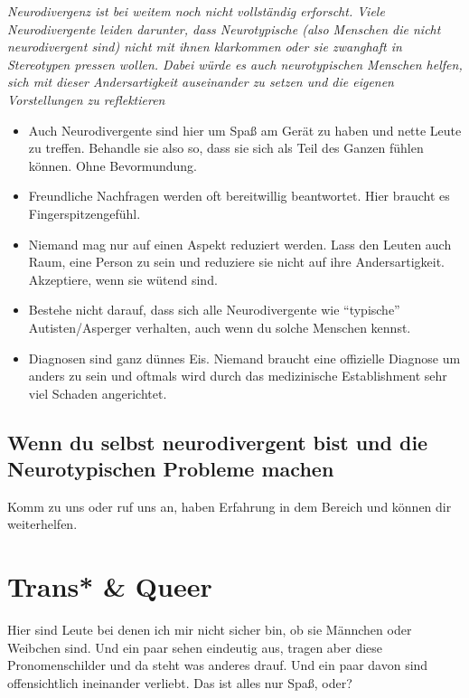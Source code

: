 \documentclass[10pt,notumble]{leaflet}
\newcommand\dos{\item[$+$]}
\newcommand\donts{\item[$-$]}
\begin{document}
\emph{Neurodivergenz ist bei weitem noch nicht vollständig
  erforscht. Viele Neurodivergente leiden darunter, dass Neurotypische
  (also Menschen die nicht neurodivergent sind) nicht mit ihnen
  klarkommen oder sie zwanghaft in Stereotypen pressen wollen. Dabei
  würde es auch neurotypischen Menschen helfen, sich mit dieser
  Andersartigkeit auseinander zu setzen und die eigenen Vorstellungen
  zu reflektieren}

\label{sec-3-1}
\begin{itemize}
\dos Auch Neurodivergente sind hier um Spaß am Gerät zu haben und
  nette Leute zu treffen. Behandle sie also so, dass sie sich als Teil
  des Ganzen fühlen können. Ohne Bevormundung.
\dos Freundliche Nachfragen werden oft bereitwillig beantwortet. Hier
  braucht es Fingerspitzengefühl.
\donts Niemand mag nur auf einen Aspekt reduziert werden. Lass den
  Leuten auch Raum, eine Person zu sein und reduziere sie nicht auf
  ihre Andersartigkeit. Akzeptiere, wenn sie wütend sind.
\donts Bestehe nicht darauf, dass sich alle Neurodivergente wie
  ``typische'' Autisten/Asperger verhalten, auch wenn du solche
  Menschen kennst.
\donts Diagnosen sind ganz dünnes Eis. Niemand braucht eine offizielle
  Diagnose um anders zu sein und oftmals wird durch das medizinische
  Establishment sehr viel Schaden angerichtet.
\end{itemize}

\subsection{Wenn du selbst neurodivergent bist und die Neurotypischen Probleme machen}
Komm zu uns oder ruf uns an, haben Erfahrung in dem
Bereich und können dir weiterhelfen.

\section{Trans* \& Queer}
\label{sec-5}
Hier sind Leute bei denen ich mir nicht sicher bin, ob sie Männchen
oder Weibchen sind. Und ein paar sehen eindeutig aus, tragen aber
diese Pronomenschilder und da steht was anderes drauf. Und ein paar
davon sind offensichtlich ineinander verliebt. Das ist alles nur Spaß,
oder?
\end{document}

